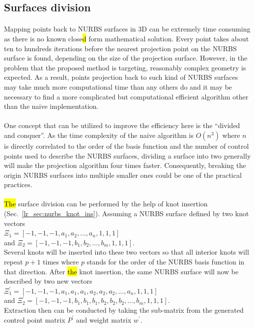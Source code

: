 \subsection{Surfaces division}
\label{oct_sc:surface_division}
\paragraph{}
Mapping points back to NURBS surfaces in 3D can be extremely time consuming as there is no known close\hl{d} form mathematical solution.
Every point takes about ten to hundreds iterations before the nearest projection point on the NURBS surface is found, depending on the size of the projection surface.
However, in the problem that the proposed method is targeting, reasonably complex geometry is expected.
As a result, points projection back to such kind of NURBS surfaces may take much more computational time than any others do and it may be necessary to find a more complicated but computational efficient algorithm other than the naive implementation.

\paragraph{}
One concept that can be utilized to improve the efficiency here is the ``divided and conquer''.
As the time complexity of the naive algorithm is $O(n^3)$ where $n$ is directly correlated to the order of the basis function and the number of control points used to describe the NURBS surfaces, dividing a surface into two generally will make the projection algorithm four times faster.
Consequently, breaking the origin NURBS surfaces into multiple smaller ones could be one of the practical practices.

\paragraph{}
\hl{The} surface division can be performed by the help of knot insertion (Sec.~\ref{lr_sec:nurbs_knot_ins}).
Assuming a NURBS surface defined by two knot vectors\\
$
\Xi_1 = [-1, -1, -1, a_1, a_2, \dots, a_n , 1, 1, 1]
$\\
and
$
\Xi_2 = [-1, -1, -1, b_1, b_2, \dots, b_m, 1, 1, 1]
$.\\
Several knots will be inserted into these two vectors so that all interior knots will repeat $p+1$ times where $p$ stands for the order of the NURBS basis function in that direction.
After \hl{the} knot insertion, the same NURBS surface will now be described by two new vectors\\
$
\Xi_1^\prime = [-1, -1, -1, a_1, a_1, a_1, a_2, a_2, a_2, \dots, a_n , 1, 1, 1]
$\\
and
$
\Xi_2^\prime = [-1, -1, -1, b_1, b_1, b_1, b_2, b_2, b_2, \dots, b_m, 1, 1, 1]
$.\\
Extraction then can be conducted by taking the sub-matrix from the generated control point matrix $P^\prime$ and weight matrix $w^\prime$.

